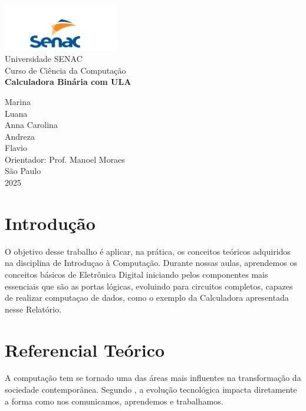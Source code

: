 \documentclass[
12pt,
openright,
oneside,
a4paper,
chapter=TITLE,
english,
brazil,
colorlinks=true,
linkcolor=blue,
citecolor=blue,
filecolor=magenta,
urlcolor=blue
]{abntex2}
\begin{document}
	
	\begin{capa}
		\begin{center}
			\includegraphics[width=5cm]{imagem/senaclogo.png} \\[1cm]
			{\large Universidade SENAC} \\
			{\large Curso de Ciência da Computação} \\
			\vfill
			{\bfseries\Large Calculadora Binária com ULA} \\
			\vfill
			
			Marina \\
			Luana \\
			Anna Carolina \\
            Andreza\\
            Flavio\\
			\vfill
			{\large Orientador: Prof. Manoel Moraes} \\
			\vfill
			São Paulo \\
			2025
		\end{center}
	\end{capa}
	
	\folhaderostocontent
	
	\cleardoublepage
	\tableofcontents
	
	\chapter{Introdução}
	O objetivo desse trabalho é aplicar, na prática, os conceitos teóricos adquiridos na disciplina de Introduçao à Computação. 
     Durante nossas aulas, aprendemos os conceitos básicos de Eletrônica Digital iniciando pelos componentes mais essenciais que são as portas lógicas, evoluindo para circuitos completos, capazes de realizar computaçao de dados, como o exemplo da Calculadora apresentada nesse Relatório.
	
	\chapter{Referencial Teórico}
	
	A computação tem se tornado uma das áreas mais influentes na transformação da sociedade contemporânea. Segundo , a evolução tecnológica impacta diretamente a forma como nos comunicamos, aprendemos e trabalhamos.
	
\end{document}
